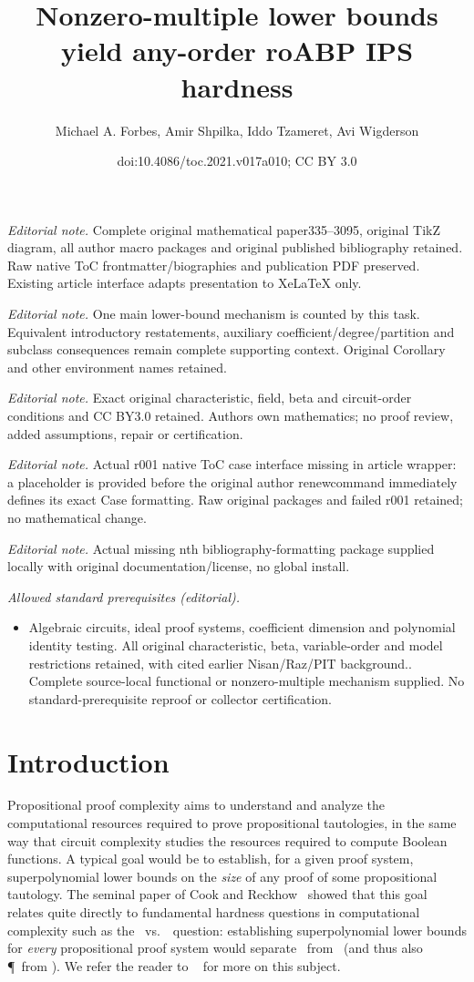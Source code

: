 \documentclass[11pt]{article}
\title{Nonzero-multiple lower bounds yield any-order roABP IPS hardness}
\author{Michael A. Forbes, Amir Shpilka, Iddo Tzameret, Avi Wigderson}
\date{doi:10.4086/toc.2021.v017a010; CC BY 3.0}
\numberwithin{equation}{section}
\theoremstyle{definition}
\theoremstyle{plain}
\begin{document}
\maketitle
\noindent\textit{Editorial note.} Complete original mathematical paper335--3095, original TikZ diagram, all author macro packages and original published bibliography retained. Raw native ToC frontmatter/biographies and publication PDF preserved. Existing article interface adapts presentation to XeLaTeX only.\par\medskip
\noindent\textit{Editorial note.} One main lower-bound mechanism is counted by this task. Equivalent introductory restatements, auxiliary coefficient/degree/partition and subclass consequences remain complete supporting context. Original Corollary and other environment names retained.\par\medskip
\noindent\textit{Editorial note.} Exact original characteristic, field, beta and circuit-order conditions and CC BY3.0 retained. Authors own mathematics; no proof review, added assumptions, repair or certification.\par\medskip
\noindent\textit{Editorial note.} Actual r001 native ToC case interface missing in article wrapper: a placeholder is provided before the original author renewcommand immediately defines its exact Case formatting. Raw original packages and failed r001 retained; no mathematical change.\par\medskip
\noindent\textit{Editorial note.} Actual missing nth bibliography-formatting package supplied locally with original documentation/license, no global install.\par\medskip
\noindent\textit{Allowed standard prerequisites (editorial).}\begin{itemize}
\item Algebraic circuits, ideal proof systems, coefficient dimension and polynomial identity testing. All original characteristic, beta, variable-order and model restrictions retained, with cited earlier Nisan/Raz/PIT background.. Complete source-local functional or nonzero-multiple mechanism supplied. No standard-prerequisite reproof or collector certification.
\end{itemize}\medskip
\section{Introduction}

Propositional proof complexity aims to understand and analyze the computational resources required to prove propositional tautologies, in the same way that circuit complexity studies the resources required to compute Boolean functions. A typical goal would be to establish, for a given proof system, superpolynomial lower bounds on the \emph{size} of any proof of some propositional tautology. The seminal paper
of Cook and Reckhow~\cite{CookReckhow79} showed that this goal relates quite directly to fundamental hardness questions in computational complexity such as the \NP\ vs.~\coNP\ question: establishing superpolynomial lower bounds for \emph{every} propositional proof system would separate \NP\ from \coNP\ (and thus also \P\ from \NP). We refer the reader to \Krajicek~\cite{Krajicek95} for more on this subject. %
\end{document}
